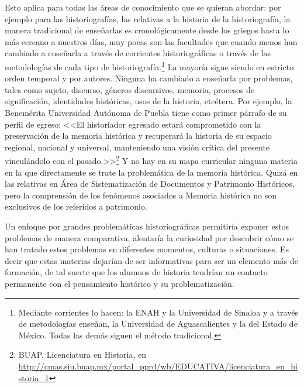 Esto aplica para todas las áreas de conocimiento que se quieran 
abordar: por ejemplo para las historiografías, las relativas a la 
historia de la historiografía, la manera tradicional de enseñarlas es 
cronológicamente desde los griegos hasta lo más cercano a nuestros 
días, muy pocas son las facultades que cuando menos han cambiado a 
enseñarla a través de corrientes historiográficas o través de las 
metodologías de cada tipo de historiografía.\footnote{Mediante 
corrientes lo hacen: la ENAH y la Universidad de Sinaloa y a través de 
metodologías enseñan, la Universidad de Aguascalientes y la del Estado 
de México. Todas las demás siguen el método tradicional.}  La mayoría 
sigue siendo en estricto orden temporal y por autores. Ninguna ha 
cambiado a enseñarla por problemas, tales como sujeto, discurso, 
géneros discursivos, memoria, procesos de significación, identidades 
históricas, usos de la historia, etcétera. Por ejemplo, la Benemérita 
Universidad Autónoma de Puebla tiene como primer párrafo de su perfil 
de egreso: <<El historiador egresado estará comprometido con la 
preservación de la memoria histórica y recuperará la historia de su 
espacio regional, nacional y universal, manteniendo una visión crítica 
del presente vinculándolo con el pasado.>>\footnote{BUAP, 
Licenciatura en Historia, en 
\url{http://cmas.siu.buap.mx/portal_pprd/wb/EDUCATIVA/licenciatura_en_historia_1} 
} Y no hay en su mapa curricular ninguna materia en la que directamente 
se trate la problemática de la memoria histórica. Quizá en las 
relativas en Área de Sistematización de Documentos y Patrimonio 
Históricos, pero la comprensión de los fenómenos asociados a Memoria 
histórica no son exclusivos de los referidos a patrimonio. 

Un enfoque por grandes problemáticas historiográficas permitiría exponer
estos problemas de manera comparativa, alentaría la curiosidad por
descubrir cómo se han tratado estos problemas en diferentes momentos,
culturas o situaciones. Es decir que estas materias dejarían de ser
informativas para ser un elemento más de formación, de tal suerte que los
alumnos de historia tendrían un contacto permanente con el pensamiento
histórico y su problematización. 

